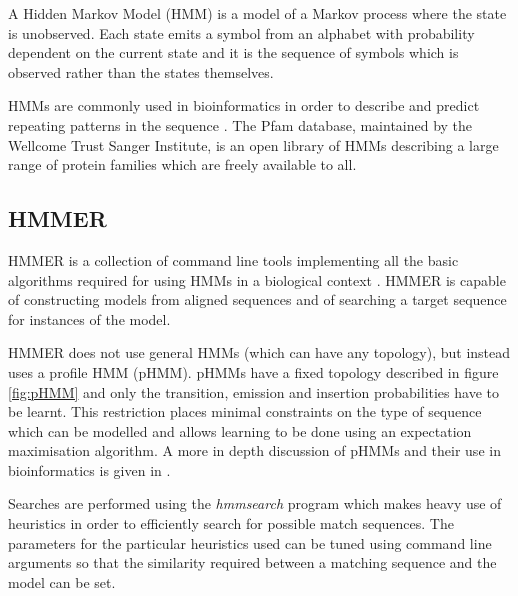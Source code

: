 A Hidden Markov Model (HMM) is a model of a Markov process where the state is
unobserved.
Each state emits a symbol from an alphabet with probability dependent on the 
current state and it is the sequence of symbols which is observed rather than
the states themselves. 

HMMs are commonly used in bioinformatics in order to describe and predict
repeating patterns in the sequence \citep{Durbin1998}.
The Pfam database, maintained by the Wellcome Trust Sanger Institute,
is an open library of HMMs describing a large range of protein families which
are freely available to all.

\subsection{HMMER}
\label{ssec:hmmer}

HMMER is a collection of command line tools implementing all the basic
algorithms required for using HMMs in a biological context \citep{HMMERguide}.
HMMER is capable of constructing models from aligned sequences and of searching
a target sequence for instances of the model.

HMMER does not use general HMMs (which can have any topology), but instead uses
a profile HMM (pHMM).
pHMMs have a fixed topology described in figure \ref{fig:pHMM} and only the 
transition, emission and insertion probabilities have to be learnt.
This restriction places minimal constraints on the type of sequence which can
be modelled and allows learning to be done using an expectation maximisation
algorithm. A more in depth discussion of pHMMs and their use in bioinformatics
is given in \citep{Durbin1998}.

Searches are performed using the \emph{hmmsearch} program which makes heavy use
of heuristics in order to efficiently search for possible match sequences.
The parameters for the particular heuristics used can be tuned using command
line arguments so that the similarity required between a matching sequence 
and the model can be set.


